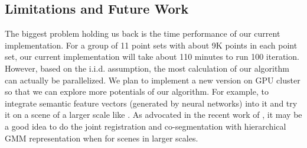 \subsection{Limitations and Future Work}
The biggest problem holding us back is the time performance of our current implementation. For a group of 11 point sets with about 9K points in each point set, our current implementation will take about 110 minutes to run 100 iteration. 
However, based on the i.i.d. assumption, the most calculation of our algorithm can actually be parallelized. 
We plan to implement a new version on GPU cluster so that we can explore more potentials of our algorithm. 
For example, to integrate semantic feature vectors (generated by neural networks) into it and try it on a scene of a larger scale like \cite{GOGMA}. 
As advocated in the recent work of \cite{AGM}, it may be a good idea to do the joint registration and co-segmentation with hierarchical GMM representation when for scenes in larger scales. 